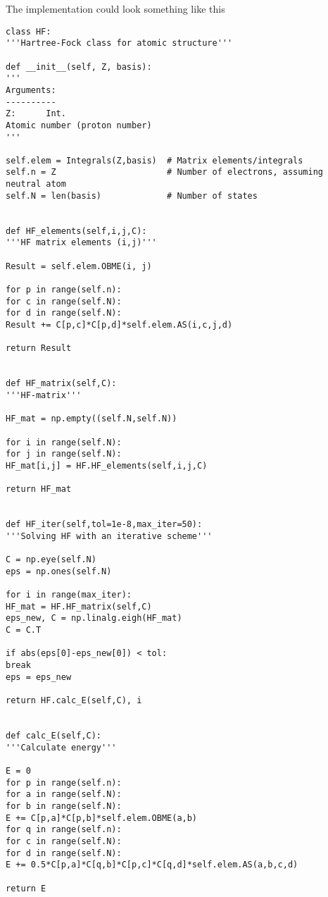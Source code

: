 The implementation could look something like this
\lstset{basicstyle=\scriptsize}
\begin{lstlisting}
class HF:
'''Hartree-Fock class for atomic structure'''

def __init__(self, Z, basis):
'''
Arguments:
----------
Z:      Int.
Atomic number (proton number)
'''

self.elem = Integrals(Z,basis)  # Matrix elements/integrals
self.n = Z                      # Number of electrons, assuming neutral atom
self.N = len(basis)             # Number of states


def HF_elements(self,i,j,C):
'''HF matrix elements (i,j)'''

Result = self.elem.OBME(i, j)

for p in range(self.n):
for c in range(self.N):
for d in range(self.N):
Result += C[p,c]*C[p,d]*self.elem.AS(i,c,j,d)

return Result


def HF_matrix(self,C):
'''HF-matrix'''

HF_mat = np.empty((self.N,self.N))

for i in range(self.N):
for j in range(self.N):
HF_mat[i,j] = HF.HF_elements(self,i,j,C)

return HF_mat


def HF_iter(self,tol=1e-8,max_iter=50):
'''Solving HF with an iterative scheme'''

C = np.eye(self.N)
eps = np.ones(self.N)

for i in range(max_iter):
HF_mat = HF.HF_matrix(self,C)
eps_new, C = np.linalg.eigh(HF_mat)
C = C.T

if abs(eps[0]-eps_new[0]) < tol:
break
eps = eps_new

return HF.calc_E(self,C), i


def calc_E(self,C):
'''Calculate energy'''

E = 0
for p in range(self.n):
for a in range(self.N):
for b in range(self.N):
E += C[p,a]*C[p,b]*self.elem.OBME(a,b)
for q in range(self.n):
for c in range(self.N):
for d in range(self.N):
E += 0.5*C[p,a]*C[q,b]*C[p,c]*C[q,d]*self.elem.AS(a,b,c,d)

return E
\end{lstlisting}
